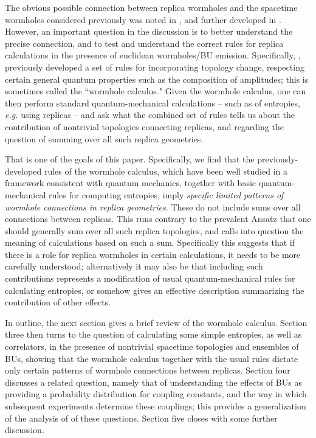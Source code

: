 \documentclass[11pt]{article}
\numberwithin{equation}{section}
\begin{document}
The obvious possible connection between replica wormholes and the spacetime wormholes considered previously was noted in \cite{Penington:2019kki, Almheiri:2019qdq}, and further developed in \cite{Marolf:2020xie}.  However,  an important question in the discussion is to better understand the precise connection, and to test and understand the correct rules for replica calculations in the presence of euclidean wormholes/BU emission.  Specifically,  \cite{GiStInc},\cite{Cole} previously developed a set of rules for incorporating topology change, respecting certain general quantum properties such as the composition of amplitudes; this is sometimes called the ``wormhole calculus."  Given the wormhole calculus, one can then perform standard quantum-mechanical calculations -- such as of entropies, {\it e.g.} using replicas -- and ask what the combined set of rules tells us about the contribution of nontrivial topologies connecting replicas, and  regarding the question of summing over all such replica geometries.

That is one of the goals of this paper.  Specifically, we find that the previously-developed  rules of the wormhole calculus, which have been well studied in a framework consistent with quantum mechanics,  together with basic quantum-mechanical rules for computing entropies, imply {\it specific limited patterns of wormhole connections in replica geometries.}  These do not include sums over all connections between replicas. This runs contrary to the prevalent Ansatz that one should generally sum over all such replica topologies\cite{Penington:2019kki, Almheiri:2019qdq}, and calls into question the meaning of calculations based on such a sum.   Specifically this suggests that if there is a role for replica wormholes in certain calculations, it needs to be more carefully understood; alternatively it may also be that including such contributions represents a modification of usual quantum-mechanical rules for calculating entropies, or somehow gives an effective description summarizing the contribution of other effects.

In outline, the next section gives a brief review of the wormhole calculus.  Section three then turns to the question of calculating some simple entropies, as well as correlators, in the presence of nontrivial spacetime topologies and ensembles of BUs, showing that the wormhole calculus together with the usual rules dictate only certain patterns of wormhole connections between replicas.  Section four discusses a related question, namely that of understanding the effects of BUs as providing a probability distribution for coupling constants, and the way in which subsequent experiments determine these couplings; this provides a generalization of the analysis of \cite{Cole,GiStInc} of these questions.  Section five closes with some further discussion.
\end{document}
